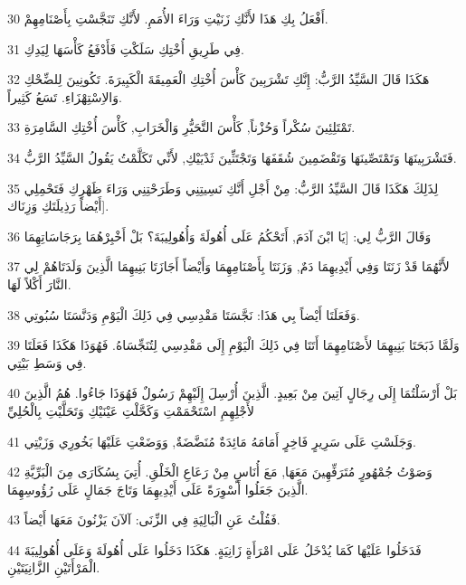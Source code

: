 \par 30 أَفْعَلُ بِكِ هَذَا لأَنَّكِ زَنَيْتِ وَرَاءَ الأُمَمِ. لأَنَّكِ تَنَجَّسْتِ بِأَصْنَامِهِمْ.
\par 31 فِي طَرِيقِ أُخْتِكِ سَلَكْتِ فَأَدْفَعُ كَأْسَهَا لِيَدِكِ.
\par 32 هَكَذَا قَالَ السَّيِّدُ الرَّبُّ: إِنَّكِ تَشْرَبِينَ كَأْسَ أُخْتِكِ الْعَمِيقَةَ الْكَبِيرَةَ. تَكُونِينَ لِلضِّحْكِ وَالاِسْتِهْزَاءِ. تَسَعُ كَثِيراً.
\par 33 تَمْتَلِئِينَ سُكْراً وَحُزْناً, كَأْسَ التَّحَيُّرِ وَالْخَرَابِ, كَأْسَ أُخْتِكِ السَّامِرَةِ.
\par 34 فَتَشْرَبِينَهَا وَتَمْتَصِّينَهَا وَتَقْضَمِينَ شُقَفَهَا وَتَجْتَثِّينَ ثَدْيَيْكِ, لأَنِّي تَكَلَّمْتُ يَقُولُ السَّيِّدُ الرَّبُّ.
\par 35 لِذَلِكَ هَكَذَا قَالَ السَّيِّدُ الرَّبُّ: مِنْ أَجْلِ أَنَّكِ نَسِيتِنِي وَطَرَحْتِنِي وَرَاءَ ظَهْرِكِ فَتَحْمِلِي أَيْضاً رَذِيلَتَكِ وَزِنَاك].
\par 36 وَقَالَ الرَّبُّ لِي: [يَا ابْنَ آدَمَ, أَتَحْكُمُ عَلَى أُهُولَةَ وَأُهُولِيبَةَ؟ بَلْ أَخْبِرْهُمَا بِرَجَاسَاتِهِمَا
\par 37 لأَنَّهُمَا قَدْ زَنَتَا وَفِي أَيْدِيهِمَا دَمٌ, وَزَنَتَا بِأَصْنَامِهِمَا وَأَيْضاً أَجَازَتَا بَنِيهِمَا الَّذِينَ وَلَدَتَاهُمْ لِي النَّارَ أَكْلاً لَهَا.
\par 38 وَفَعَلَتَا أَيْضاً بِي هَذَا: نَجَّسَتَا مَقْدِسِي فِي ذَلِكَ الْيَوْمِ وَدَنَّسَتَا سُبُوتِي.
\par 39 وَلَمَّا ذَبَحَتَا بَنِيهِمَا لأَصْنَامِهِمَا أَتَتَا فِي ذَلِكَ الْيَوْمِ إِلَى مَقْدِسِي لِتُنَجِّسَاهُ. فَهُوَذَا هَكَذَا فَعَلَتَا فِي وَسَطِ بَيْتِي.
\par 40 بَلْ أَرْسَلْتُمَا إِلَى رِجَالٍ آتِينَ مِنْ بَعِيدٍ. الَّذِينَ أُرْسِلَ إِلَيْهِمْ رَسُولٌ فَهُوَذَا جَاءُوا. هُمُ الَّذِينَ لأَجْلِهِمِ اسْتَحْمَمْتِ وَكَحَّلْتِ عَيْنَيْكِ وَتَحَلَّيْتِ بِالْحُلِيِّ
\par 41 وَجَلَسْتِ عَلَى سَرِيرٍ فَاخِرٍ أَمَامَهُ مَائِدَةٌ مُنَضَّضَةٌ, وَوَضَعْتِ عَلَيْهَا بَخُورِي وَزَيْتِي.
\par 42 وَصَوْتُ جُمْهُورٍ مُتَرَفِّهِينَ مَعَهَا, مَعَ أُنَاسٍ مِنْ رَعَاعِ الْخَلْقِ. أُتِيَ بِسُكَارَى مِنَ الْبَرِّيَّةِ الَّذِينَ جَعَلُوا أَسْوِرَةً عَلَى أَيْدِيهِمَا وَتَاجَ جَمَالٍ عَلَى رُؤُوسِهِمَا.
\par 43 فَقُلْتُ عَنِ الْبَالِيَةِ فِي الزِّنَى: آلآنَ يَزْنُونَ مَعَهَا أَيْضاً.
\par 44 فَدَخَلُوا عَلَيْهَا كَمَا يُدْخَلُ عَلَى امْرَأَةٍ زَانِيَةٍ. هَكَذَا دَخَلُوا عَلَى أُهُولَةَ وَعَلَى أُهُولِيبَةَ الْمَرْأَتَيْنِ الزَّانِيَتَيْنِ.
